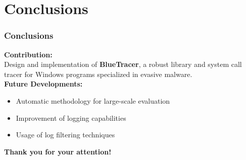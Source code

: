 \documentclass[compress]{beamer}
\begin{document}
\begin{frame}[fragile]


\end{frame}

\section{Conclusions}

\begin{frame}
    \frametitle{Conclusions}
	
	\textbf{\textcolor{sapienza}{Contribution:}} \\
	\smallskip	
	\tab Design and implementation of \textbf{BlueTracer},
a robust library and system call tracer for Windows programs specialized in evasive
malware.
	\\\bigskip
	\textbf{\textcolor{sapienza}{Future Developments:}} \\
	\begin{itemize}
	\item Automatic methodology for large-scale evaluation 
	\item Improvement of logging capabilities
	\item Usage of log filtering techniques
	\end{itemize}

\end{frame}

\begin{frame}
\begin{center}
{\fontsize{15}{15}\selectfont \textbf{Thank you for your attention!}}
\end{center}
\end{frame}
\end{document}
